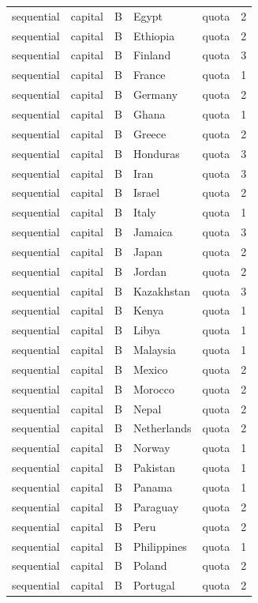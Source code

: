 \begin{tabular}{lllllr}
sequential & capital & B & Egypt & quota & 2 \\
sequential & capital & B & Ethiopia & quota & 2 \\
sequential & capital & B & Finland & quota & 3 \\
sequential & capital & B & France & quota & 1 \\
sequential & capital & B & Germany & quota & 2 \\
sequential & capital & B & Ghana & quota & 1 \\
sequential & capital & B & Greece & quota & 2 \\
sequential & capital & B & Honduras & quota & 3 \\
sequential & capital & B & Iran & quota & 3 \\
sequential & capital & B & Israel & quota & 2 \\
sequential & capital & B & Italy & quota & 1 \\
sequential & capital & B & Jamaica & quota & 3 \\
sequential & capital & B & Japan & quota & 2 \\
sequential & capital & B & Jordan & quota & 2 \\
sequential & capital & B & Kazakhstan & quota & 3 \\
sequential & capital & B & Kenya & quota & 1 \\
sequential & capital & B & Libya & quota & 1 \\
sequential & capital & B & Malaysia & quota & 1 \\
sequential & capital & B & Mexico & quota & 2 \\
sequential & capital & B & Morocco & quota & 2 \\
sequential & capital & B & Nepal & quota & 2 \\
sequential & capital & B & Netherlands & quota & 2 \\
sequential & capital & B & Norway & quota & 1 \\
sequential & capital & B & Pakistan & quota & 1 \\
sequential & capital & B & Panama & quota & 1 \\
sequential & capital & B & Paraguay & quota & 2 \\
sequential & capital & B & Peru & quota & 2 \\
sequential & capital & B & Philippines & quota & 1 \\
sequential & capital & B & Poland & quota & 2 \\
sequential & capital & B & Portugal & quota & 2 \\

\end{tabular}

